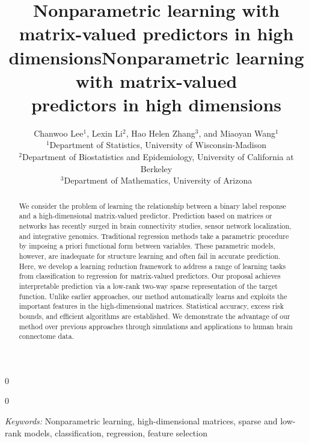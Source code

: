 \documentclass[11pt]{article}
\newcommand{\blind}{0}
\theoremstyle{definition}
\begin{document}
\blind
{   \date{}
  \title{\vspace*{-2cm}\bf Nonparametric learning with matrix-valued predictors in high dimensions}
\author{\vspace*{-.3cm} Chanwoo Lee$^{1}$, Lexin Li$^2$, Hao Helen Zhang$^3$, and Miaoyan Wang$^1$\\\vspace*{-.2cm}
$^1$Department of Statistics, University of Wisconsin-Madison\\
$^2$Department of Biostatistics and Epidemiology, University of California at Berkeley\\
$^3$Department of Mathematics, University of Arizona\\
}

    \maketitle
} \fi

\blind
{
 \date{}
  \title{\vspace*{-1cm}\bf Nonparametric learning with matrix-valued \\predictors in high dimensions}
\author{}
\maketitle
} \fi

\vspace{-2cm}
\begin{abstract}
We consider the problem of learning the relationship between a binary label response and a high-dimensional matrix-valued predictor. Prediction based on matrices or networks has recently surged in brain connectivity studies, sensor network localization, and integrative genomics. Traditional regression methods take a parametric procedure by imposing a priori functional form between variables. These parametric models, however, are inadequate for structure learning and often fail in accurate prediction. Here, we develop a learning reduction framework to address a range of learning tasks from classification to regression for matrix-valued predictors. Our proposal achieves interpretable prediction via a low-rank two-way sparse representation of the target function. Unlike earlier approaches, our method automatically learns and exploits the important features in the high-dimensional matrices. Statistical accuracy, excess risk bounds, and efficient algorithms are established. We demonstrate the advantage of our method over previous approaches through simulations and applications to human brain connectome data. 

\end{abstract}
\vspace{-.2cm}
\noindent%
{\it Keywords:}  Nonparametric learning, high-dimensional matrices, sparse and low-rank models, classification, regression, feature selection
\end{document}

